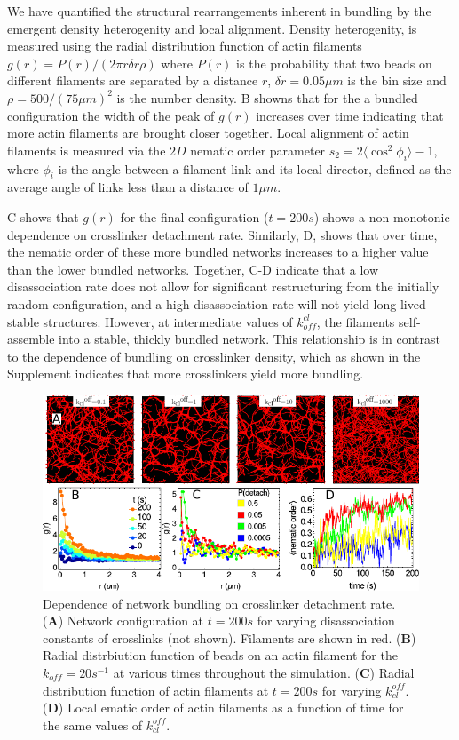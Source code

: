\documentclass[12pt]{article}
\begin{document}
We have quantified the structural rearrangements inherent in bundling by the 
emergent density heterogenity and local alignment. 
Density heterogenity, is measured using the radial
distribution function of actin filaments  $g(r) = P(r)/(2\pi r \delta r\rho)$ 
where $P(r)$ is the probability that two beads on different filaments are 
separated by a distance $r$, $\delta r =0.05 \mu m$ is the bin size and 
$\rho = 500/(75\mu m)^2$ is the number density. B showns that 
for the a bundled configuration the width of the peak of $g(r)$ increases over 
time indicating that more actin filaments are brought closer together. 
Local alignment of actin filaments is measured via the $2D$ nematic order 
parameter $s_2=2\langle\cos^2{\phi_i}\rangle-1$, where $\phi_i$ is the angle 
between a filament link and its local director, defined as the average angle of 
links less than a distance of $1\mu m$.
\par
{}C shows that $g(r)$ for the final configuration ($t=200s$) 
shows a non-monotonic dependence on crosslinker detachment rate. 
Similarly, D, shows that over time, the nematic order of these
more bundled networks increases to a higher value than the lower bundled
networks. Together, C-D indicate that a low disassociation rate
does not allow for significant restructuring from the 
initially random configuration, and a high disassociation rate will not yield 
long-lived stable structures. However, at intermediate values of $k_{off}^{cl}$,
the filaments self-assemble into a stable, thickly bundled network. This 
relationship is in contrast to the dependence of bundling on crosslinker density, 
which as shown in the Supplement indicates that more crosslinkers yield more 
bundling. 
\par
\begin{figure}[H] 
  \centering
  \includegraphics[scale=1.2]{figs/bundling/full_figure.pdf}
  \caption{%
  \label{fig:bundle}%
  Dependence of network bundling on crosslinker detachment rate.
  (\textbf{A}) Network configuration at $t=200s$ for varying disassociation 
  constants of crosslinks (not shown). Filaments are shown in red. 
  (\textbf{B}) Radial distrbiution function of beads on an actin filament for 
  the $k_{off}=20 s^{-1}$ at various times throughout the simulation. 
  (\textbf{C}) Radial distribution function of actin filaments at $t=200s$ for 
  varying $k_{cl}^{off}$.  
  (\textbf{D}) Local ematic order of actin filaments as a function of time for 
  the same values of $k_{cl}^{off}$.  
}
\end{figure}
\end{document}
